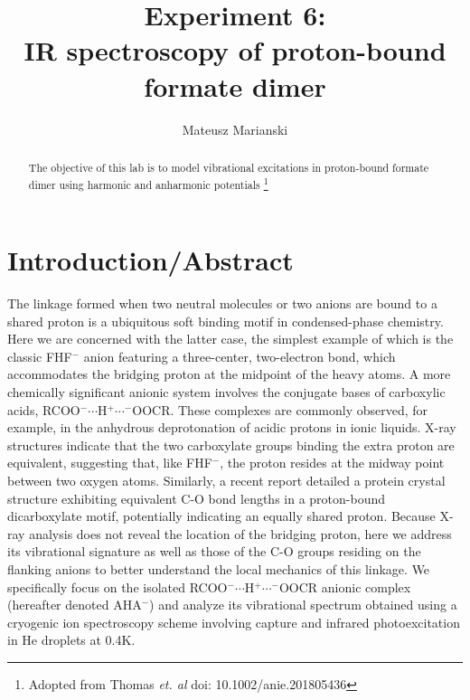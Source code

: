 \documentclass{tufte-handout}
\title{Experiment 6: \\ IR  spectroscopy of proton-bound formate dimer}
\author{Mateusz Marianski }
\begin{document}
\maketitle%

\begin{abstract}
\noindent
The objective of this lab is to model vibrational excitations in proton-bound formate dimer using harmonic and anharmonic potentials \thanks{Adopted from Thomas {\it et. al} doi: 10.1002/anie.201805436}
\end{abstract}



\section{Introduction/Abstract} %
The linkage formed when two neutral molecules or two anions are bound to a shared proton is a ubiquitous soft binding motif in condensed-phase chemistry.
Here we are concerned with the latter case, the simplest example of which is the classic FHF$^-$ anion featuring a three-center, two-electron bond, which accommodates the bridging proton at the midpoint of the heavy atoms. 
A more chemically significant anionic system involves the conjugate bases of carboxylic acids, RCOO$^-\cdots$H$^{+}\cdots^{-}$OOCR. These complexes are commonly observed, for example, in the anhydrous deprotonation of acidic protons in ionic liquids.
X-ray structures indicate that the two carboxylate groups binding the extra proton are equivalent, suggesting that, like FHF$^-$, the proton resides at the midway point between two oxygen atoms.
Similarly, a recent report detailed a protein crystal structure exhibiting equivalent C-O bond lengths in a proton-bound dicarboxylate motif, potentially indicating an equally shared proton.
Because X-ray analysis does not reveal the location of the bridging proton, here we address its vibrational signature as well as those of the C-O groups residing on the flanking anions to better understand the local mechanics of this linkage. We specifically focus on the isolated RCOO$^-\cdots$H$^{+}\cdots^{-}$OOCR anionic complex (hereafter denoted AHA$^-$) and analyze its vibrational spectrum obtained using a cryogenic ion spectroscopy scheme involving capture and infrared photoexcitation in He droplets at 0.4K.
\end{document}
